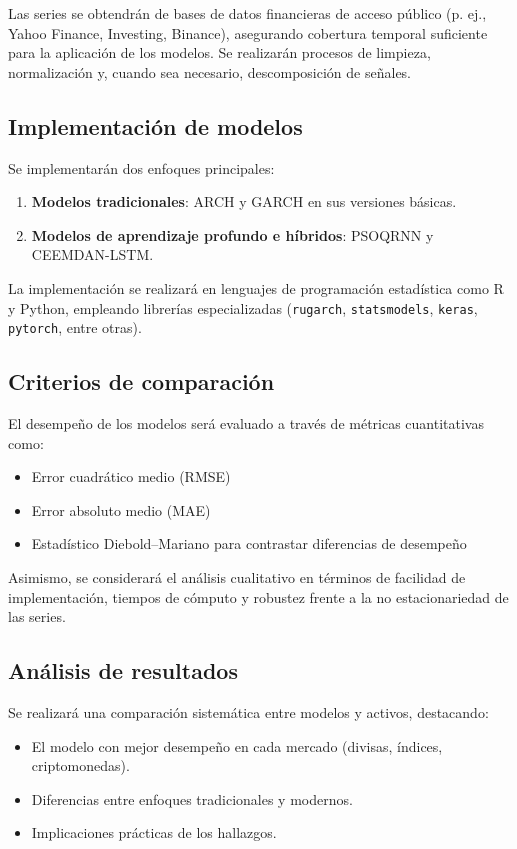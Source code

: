 \documentclass[12pt]{paper}
\begin{document}
Las series se obtendrán de bases de datos financieras de acceso público (p. ej., Yahoo Finance, Investing, Binance), asegurando cobertura temporal suficiente para la aplicación de los modelos. Se realizarán procesos de limpieza, normalización y, cuando sea necesario, descomposición de señales.

\subsection{Implementación de modelos}
Se implementarán dos enfoques principales:
\begin{enumerate}
    \item \textbf{Modelos tradicionales}: ARCH y GARCH en sus versiones básicas.
    \item \textbf{Modelos de aprendizaje profundo e híbridos}: PSOQRNN y CEEMDAN-LSTM.
\end{enumerate}

La implementación se realizará en lenguajes de programación estadística como R y Python, empleando librerías especializadas (\texttt{rugarch}, \texttt{statsmodels}, \texttt{keras}, \texttt{pytorch}, entre otras).

\subsection{Criterios de comparación}
El desempeño de los modelos será evaluado a través de métricas cuantitativas como:
\begin{itemize}
    \item Error cuadrático medio (RMSE)
    \item Error absoluto medio (MAE)
    \item Estadístico Diebold–Mariano para contrastar diferencias de desempeño
\end{itemize}

Asimismo, se considerará el análisis cualitativo en términos de facilidad de implementación, tiempos de cómputo y robustez frente a la no estacionariedad de las series.

\subsection{Análisis de resultados}
Se realizará una comparación sistemática entre modelos y activos, destacando:
\begin{itemize}
    \item El modelo con mejor desempeño en cada mercado (divisas, índices, criptomonedas).
    \item Diferencias entre enfoques tradicionales y modernos.
    \item Implicaciones prácticas de los hallazgos.
\end{itemize}
\end{document}

